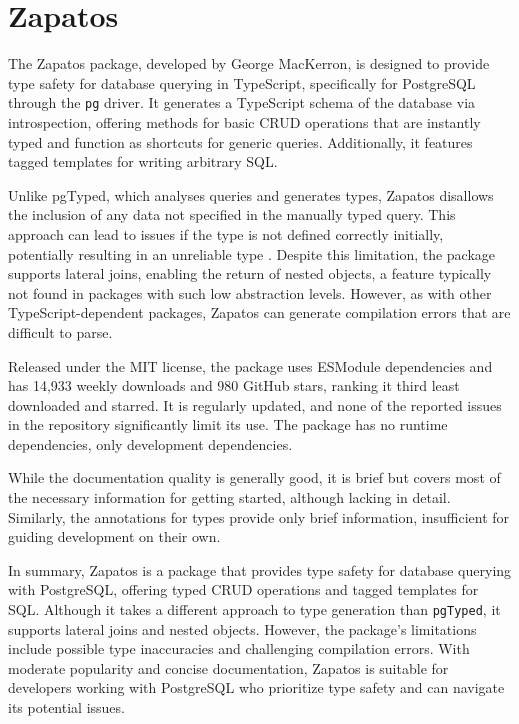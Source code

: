 \section{Zapatos}
The Zapatos package, developed by George MacKerron, is designed to provide type
safety for database querying in TypeScript, specifically for PostgreSQL through
the \texttt{pg} driver. It generates a TypeScript schema of the database via
introspection, offering methods for basic CRUD operations that are instantly
typed and function as shortcuts for generic queries. Additionally, it features
tagged templates for writing arbitrary SQL.

Unlike pgTyped, which analyses queries and generates types, Zapatos disallows
the inclusion of any data not specified in the manually typed query. This
approach can lead to issues if the type is not defined correctly initially,
potentially resulting in an unreliable type . Despite this limitation, the package supports
lateral joins, enabling the return of nested objects, a feature typically not
found in packages with such low abstraction levels. However, as with other
TypeScript-dependent packages, Zapatos can generate compilation errors that are
difficult to parse.

Released under the MIT license, the package uses ESModule dependencies and has
14,933 weekly downloads and 980 GitHub stars, ranking it third least downloaded
and starred. It is regularly updated, and none of the reported issues in the
repository significantly limit its use. The package has no runtime dependencies,
only development dependencies.

While the documentation quality is generally good, it is brief but covers most
of the necessary information for getting started, although lacking in detail.
Similarly, the annotations for types provide only brief information,
insufficient for guiding development on their own.

In summary, Zapatos is a package that provides type safety for database querying
with PostgreSQL, offering typed CRUD operations and tagged templates for SQL.
Although it takes a different approach to type generation than \texttt{pgTyped},
it supports lateral joins and nested objects. However, the package's limitations
include possible type inaccuracies and challenging compilation errors. With
moderate popularity and concise documentation, Zapatos is suitable for
developers working with PostgreSQL who prioritize type safety and can navigate
its potential issues.

